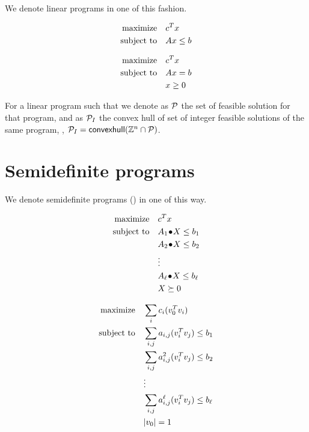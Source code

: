 \documentclass[a4paper,justified]{tufte-handout}
\begin{document}
We denote linear programs in one of this fashion.

\begin{figure}
\begin{minipage}[t]{0.5\textwidth}
\begin{alignat*}{2}
  \text{maximize}\hspace{1em}& c^{T}x\\
  \text{subject to}\hspace{1em}& Ax \leq b
\end{alignat*}
\end{minipage}
\begin{minipage}[t]{0.5\textwidth}
\begin{alignat*}{2}
  \text{maximize}\hspace{1em}& c^{T}x \\
  \text{subject to}\hspace{1em}& Ax = b\\
  & x \geq 0
\end{alignat*}
\end{minipage}
\end{figure}

For a linear program such that we denote as $ \mathcal{P} $ the set of
feasible solution for that program, and as $ \mathcal{P}_{I} $ the convex
hull of set of integer feasible solutions of the same program, \ie, $
\mathcal{P}_{I} = \mathsf{convexhull}(\mathbb{Z}^{n} \cap \mathcal{P}) $.

\section{Semidefinite programs}

We denote semidefinite programs (\sdp) in one of this way.

\begin{figure}
\begin{minipage}[t]{0.5\textwidth}
\begin{alignat*}{2}
  \text{maximize}\hspace{1em}& c^{T}x\\
  \text{subject to}\hspace{1em}& {A_{1}}\!\bullet\!{X} \leq b_{1}\\
  & {A_{2}}\!\bullet\!{X} \leq b_{2}\\
  & \vdots \\
  & {A_{\ell}}\!\bullet\!{X} \leq b_{\ell}\\
  & X \succeq 0
\end{alignat*}
\end{minipage}
\begin{minipage}[t]{0.5\textwidth}
\begin{alignat*}{2}
  \text{maximize}\hspace{1em}& \sum_{i}c_{i} (v_{0}^{T}v_{i}) \\
  \text{subject to}\hspace{1em}& \sum_{i,j} a_{i,j} (v^{T}_{i}v_{j})\leq b_{1}\\
  & \sum_{i,j} a^{2}_{i,j} (v^{T}_{i}v_{j})\leq b_{2}\\
  & \vdots \\
  & \sum_{i,j} a^{\ell}_{i,j} (v^{T}_{i}v_{j})\leq b_{\ell}\\
  & |v_{0}| = 1
\end{alignat*}
\end{minipage}
\end{figure}
\end{document}
